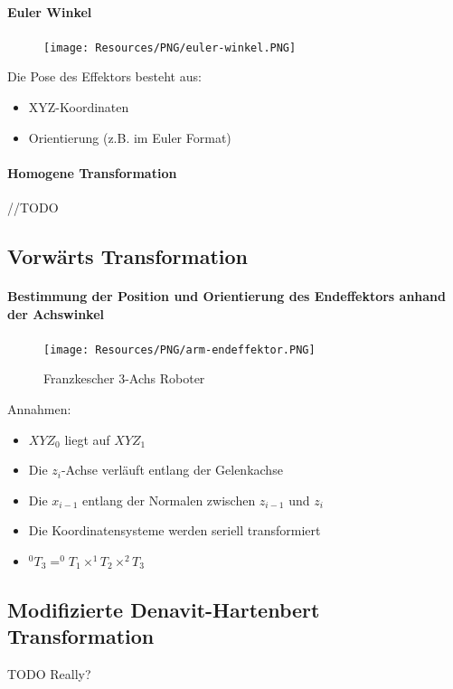 \paragraph{Euler Winkel}
\begin{figure}[H]
	\begin{center}
		\texttt{[image: Resources/PNG/euler-winkel.PNG]}
		\caption{}
		\label{fig:PNG/euler-winkle.PNG}
	\end{center}
\end{figure}
Die Pose des Effektors besteht aus:
\begin{itemize}
	\item XYZ-Koordinaten
	\item Orientierung (z.B. im Euler Format)
\end{itemize}
\paragraph{Homogene Transformation}
//TODO
\subsection{Vorwärts Transformation}
\paragraph{Bestimmung der Position und Orientierung des Endeffektors anhand der Achswinkel}
\begin{figure}[H]
	\begin{center}
		\texttt{[image: Resources/PNG/arm-endeffektor.PNG]}
		\caption{Franzkescher 3-Achs Roboter}
		\label{fig:PNG/arm-endeffektor.PNG}
	\end{center}
\end{figure}
Annahmen:
\begin{itemize}
	\item $XYZ_0$ liegt auf $XYZ_1$
	\item Die $z_i$-Achse verläuft entlang der Gelenkachse
	\item Die $x_{i-1}$ entlang der Normalen zwischen $z_{i-1}$ und $z_i$
	\item Die Koordinatensysteme werden seriell transformiert
	\item $^0T_3 = ^0T_1 \times ^1T_2 \times ^2T_3$
\end{itemize}
\subsection{Modifizierte Denavit-Hartenbert Transformation}
TODO Really?
